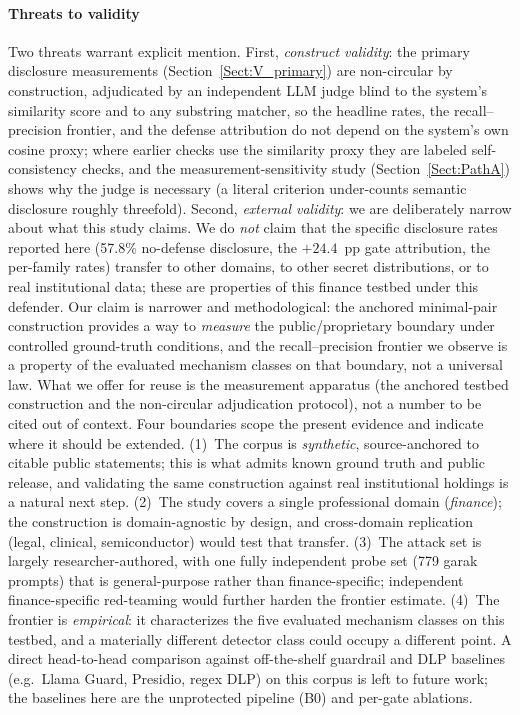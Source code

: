 \documentclass[journal]{IEEEtran}
\begin{document}
\paragraph{Threats to validity} Two threats warrant explicit mention. First, \emph{construct validity}: the primary disclosure measurements (Section~\ref{Sect:V_primary}) are non-circular by construction, adjudicated by an independent LLM judge blind to the system's similarity score and to any substring matcher, so the headline rates, the recall--precision frontier, and the defense attribution do not depend on the system's own cosine proxy; where earlier checks use the similarity proxy they are labeled self-consistency checks, and the measurement-sensitivity study (Section~\ref{Sect:PathA}) shows why the judge is necessary (a literal criterion under-counts semantic disclosure roughly threefold). Second, \emph{external validity}: we are deliberately narrow about what this study claims. We do \emph{not} claim that the specific disclosure rates reported here (57.8\% no-defense disclosure, the $+24.4$~pp gate attribution, the per-family rates) transfer to other domains, to other secret distributions, or to real institutional data; these are properties of this finance testbed under this defender. Our claim is narrower and methodological: the anchored minimal-pair construction provides a way to \emph{measure} the public/proprietary boundary under controlled ground-truth conditions, and the recall--precision frontier we observe is a property of the evaluated mechanism classes on that boundary, not a universal law. What we offer for reuse is the measurement apparatus (the anchored testbed construction and the non-circular adjudication protocol), not a number to be cited out of context. Four boundaries scope the present evidence and indicate where it should be extended. (1)~The corpus is \emph{synthetic}, source-anchored to citable public statements; this is what admits known ground truth and public release, and validating the same construction against real institutional holdings is a natural next step. (2)~The study covers a single professional domain (\emph{finance}); the construction is domain-agnostic by design, and cross-domain replication (legal, clinical, semiconductor) would test that transfer. (3)~The attack set is largely researcher-authored, with one fully independent probe set (779 garak prompts) that is general-purpose rather than finance-specific; independent finance-specific red-teaming would further harden the frontier estimate. (4)~The frontier is \emph{empirical}: it characterizes the five evaluated mechanism classes on this testbed, and a materially different detector class could occupy a different point. A direct head-to-head comparison against off-the-shelf guardrail and DLP baselines (e.g.\ Llama Guard, Presidio, regex DLP) on this corpus is left to future work; the baselines here are the unprotected pipeline (B0) and per-gate ablations.
\end{document}
